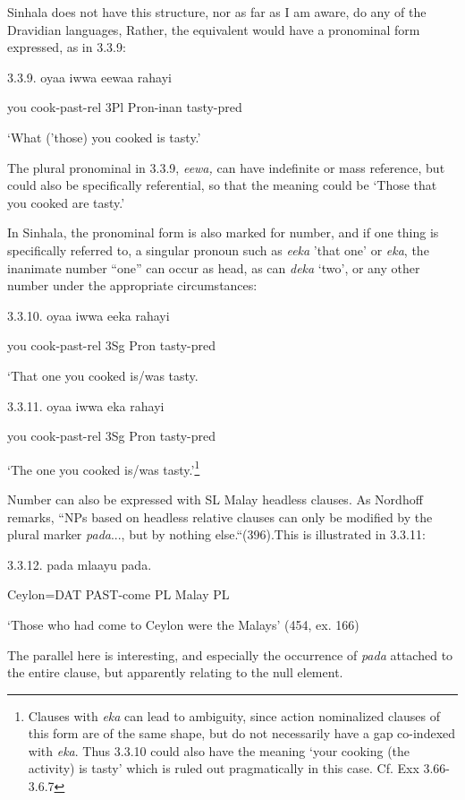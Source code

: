 \documentclass[letterpaper]{article}
\begin{document}
Sinhala does not have this structure, nor as far as I am aware, do any of the Dravidian languages, Rather, the equivalent would have a pronominal form expressed, as in 3.3.9:

 3.3.9.
\ea
\gll   oyaa  iwwa  eewaa  rahayi

  you cook-past-rel 3Pl Pron-inan tasty-pred

  `What ('those) you cooked is tasty.'

The plural pronominal in 3.3.9, \textit{eewa,} can have indefinite or mass reference, but could also be specifically referential, so that the meaning could be `Those that you cooked are tasty.'

 In Sinhala, the pronominal form is also marked for number, and if one thing is specifically referred to, a singular pronoun such as \textit{eeka} 'that one' or \textit{eka}, the inanimate number ``one'' can occur as head, as can \textit{deka} `two', or any other number  under the appropriate circumstances:

 3.3.10.
\ea
\gll  oyaa iwwa  eeka   rahayi

  you cook-past-rel 3Sg Pron tasty-pred

  `That one you cooked is/was tasty. 

 3.3.11. 
\ea
\gll oyaa iwwa  eka   rahayi

  you cook-past-rel 3Sg Pron tasty-pred

  `The one you cooked is/was  tasty.'\footnote{Clauses
  with \textit{eka} can lead to ambiguity, since action nominalized clauses of this form are of the same shape, but do not necessarily have a gap co-indexed with \textit{eka}. Thus 3.3.10 could also have the meaning `your cooking (the activity) is tasty' which is ruled out pragmatically in this case. Cf. Exx 3.66-3.6.7}

 Number can also be expressed with SL Malay headless clauses. As Nordhoff remarks, ``NPs based on headless relative clauses can only be modified by the plural marker \textit{pada}..., but by nothing else.``(396).This is illustrated in 3.3.11:

 3.3.12.
\ea
\gll  [Seelon=nang anà dhaatang {\O}] pada mlaayu pada.

  Ceylon=DAT PAST-come   PL Malay  PL

  `Those who had come to Ceylon were the Malays'  (454, ex. 166)

 The parallel here is interesting, and especially the occurrence of \textit{pada} attached to the entire clause, but apparently relating to the null element.
\end{document}
